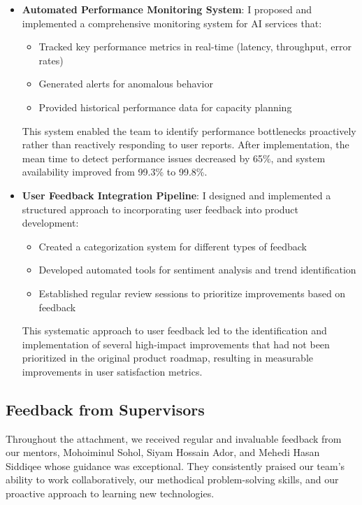 \documentclass[12pt,a4paper]{article}
\begin{document}
\begin{itemize}
    \item \textbf{Automated Performance Monitoring System}: I proposed and implemented a comprehensive monitoring system for AI services that:
    \begin{itemize}
        \item Tracked key performance metrics in real-time (latency, throughput, error rates)
        \item Generated alerts for anomalous behavior
        \item Provided historical performance data for capacity planning
    \end{itemize}
    This system enabled the team to identify performance bottlenecks proactively rather than reactively responding to user reports. After implementation, the mean time to detect performance issues decreased by 65\%, and system availability improved from 99.3\% to 99.8\%.
    
    \item \textbf{User Feedback Integration Pipeline}: I designed and implemented a structured approach to incorporating user feedback into product development:
    \begin{itemize}
        \item Created a categorization system for different types of feedback
        \item Developed automated tools for sentiment analysis and trend identification
        \item Established regular review sessions to prioritize improvements based on feedback
    \end{itemize}
    This systematic approach to user feedback led to the identification and implementation of several high-impact improvements that had not been prioritized in the original product roadmap, resulting in measurable improvements in user satisfaction metrics.

\end{itemize}
\subsection{Feedback from Supervisors}

Throughout the attachment, we received regular and invaluable feedback from our mentors, Mohoiminul Sohol, Siyam Hossain Ador, and Mehedi Hasan Siddiqee whose guidance was exceptional. They consistently praised our team’s ability to work collaboratively, our methodical problem-solving skills, and our proactive approach to learning new technologies.
\end{document}
